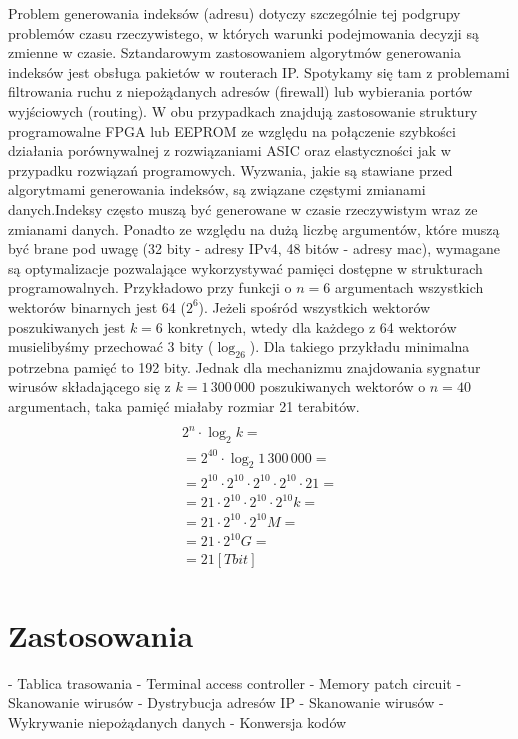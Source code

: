 Problem generowania indeksów (adresu) dotyczy szczególnie tej podgrupy problemów czasu rzeczywistego,
w których warunki podejmowania decyzji są zmienne w czasie.
Sztandarowym zastosowaniem algorytmów generowania indeksów jest obsługa pakietów w routerach IP.
Spotykamy się tam z problemami filtrowania ruchu z niepożądanych adresów (firewall) lub wybierania portów wyjściowych (routing).
W obu przypadkach znajdują zastosowanie struktury programowalne FPGA lub EEPROM
ze względu na połączenie szybkości działania porównywalnej z rozwiązaniami ASIC oraz elastyczności jak w przypadku rozwiązań programowych.
Wyzwania,
jakie są stawiane przed algorytmami generowania indeksów,
są związane częstymi zmianami danych.Indeksy często muszą być generowane w czasie rzeczywistym wraz ze zmianami danych.
Ponadto ze względu na dużą liczbę argumentów,
które muszą być brane pod uwagę (32 bity - adresy IPv4, 48 bitów - adresy mac),
wymagane są optymalizacje pozwalające wykorzystywać pamięci dostępne w strukturach programowalnych.
Przykładowo przy funkcji o $n=6$ argumentach wszystkich wektorów binarnych jest 64 ($2^6$).
Jeżeli spośród wszystkich wektorów poszukiwanych jest $k=6$ konkretnych, wtedy dla każdego z 64 wektorów musielibyśmy przechować 3 bity ($\log_26$).
Dla takiego przykładu minimalna potrzebna pamięć to 192 bity.
Jednak dla mechanizmu znajdowania sygnatur wirusów składającego się z $k=1\,300\,000$ poszukiwanych wektorów o $n=40$ argumentach, taka pamięć miałaby rozmiar 21 terabitów.
\begin{multline} \\
2^n \cdot \log_2 k = \\
= 2^{40} \cdot \log_2 1\,300\,000 = \\
= 2^{10} \cdot 2^{10} \cdot 2^{10} \cdot 2^{10} \cdot 21 = \\
=21 \cdot 2^{10} \cdot 2^{10} \cdot 2^{10} k = \\
=21 \cdot 2^{10} \cdot 2^{10} M = \\
=21 \cdot 2^{10} G = \\
=21 [Tbit] \\
\end{multline}


\section{Zastosowania}
- Tablica trasowania
- Terminal access controller
- Memory patch circuit
- Skanowanie wirusów
- Dystrybucja adresów IP
- Skanowanie wirusów
- Wykrywanie niepożądanych danych
- Konwersja kodów

